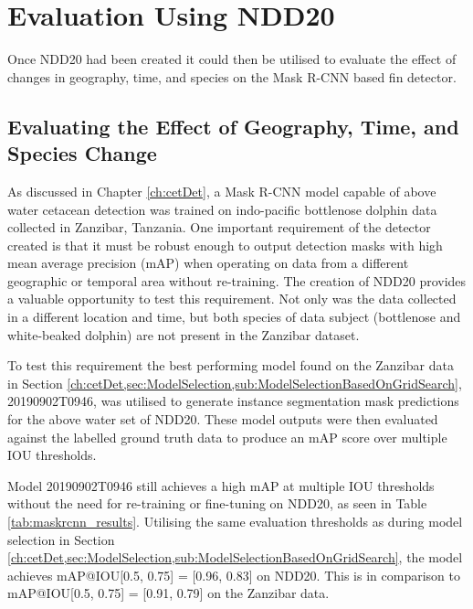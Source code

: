 \section{Evaluation Using NDD20}\label{ch:NDD,sec:EvalUsingNDD20}

Once NDD20 had been created it could then be utilised to evaluate the effect of changes in geography, time, and species on the Mask R-CNN based fin detector.

\subsection{Evaluating the Effect of Geography, Time, and Species Change}\label{ch:NDD,sec:EvalUsingNDD20,subsec:geographyTimeSpeciesChange}

As discussed in Chapter \ref{ch:cetDet}, a Mask R-CNN model capable of above water cetacean detection was trained on indo-pacific bottlenose dolphin data collected in Zanzibar, Tanzania. One important requirement of the detector created is that it must be robust enough to output detection masks with high mean average precision (mAP) when operating on data from a different geographic or temporal area without re-training. The creation of NDD20 provides a valuable opportunity to test this requirement. Not only was the data collected in a different location and time, but both species of data subject (bottlenose and white-beaked dolphin) are not present in the Zanzibar dataset.  

To test this requirement the best performing model found on the Zanzibar data in Section \ref{ch:cetDet,sec:ModelSelection,sub:ModelSelectionBasedOnGridSearch}, 20190902T0946, was utilised to generate instance segmentation mask predictions for the above water set of NDD20. These model outputs were then evaluated against the labelled ground truth data to produce an mAP score over multiple IOU thresholds.

Model 20190902T0946 still achieves a high mAP at multiple IOU thresholds without the need for re-training or fine-tuning on NDD20, as seen in Table \ref{tab:maskrcnn_results}. Utilising the same evaluation thresholds as during model selection in Section \ref{ch:cetDet,sec:ModelSelection,sub:ModelSelectionBasedOnGridSearch}, the model achieves mAP@IOU[0.5, 0.75] = [0.96, 0.83] on NDD20. This is in comparison to mAP@IOU[0.5, 0.75] = [0.91, 0.79] on the Zanzibar data.

